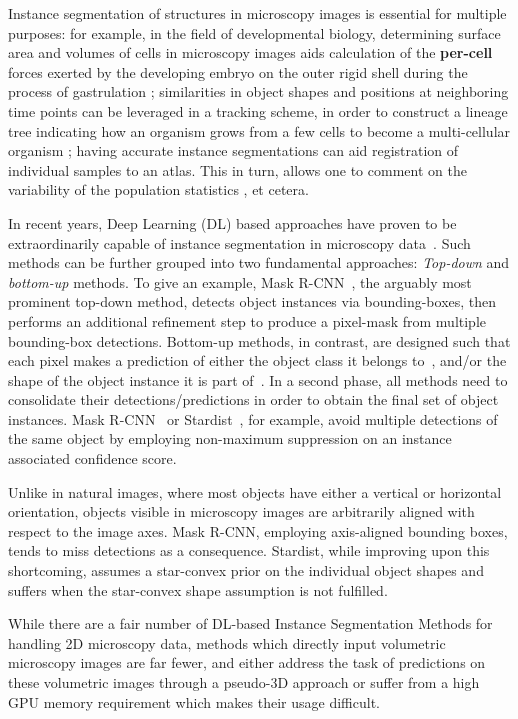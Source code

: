 \documentclass{midl} %
\begin{document}
Instance segmentation of structures in microscopy images is essential for multiple purposes: 
for example, in the field of developmental biology, determining surface area and volumes of cells in microscopy images aids calculation of the \textbf{per-cell} forces  exerted by the developing embryo on the outer rigid shell during the process of gastrulation \cite{munster2019}; 
similarities in  object shapes and positions at neighboring time points can be leveraged in a tracking scheme, in order to construct a lineage tree indicating how an organism grows from a few cells to become a multi-cellular organism \cite{tinevez2016};
having accurate instance segmentations can aid registration of individual samples to an atlas. This in turn, allows one to comment on the variability of the population statistics \cite{}, et cetera.

In recent years, Deep Learning (DL) based approaches have proven to be extraordinarily capable of instance segmentation in microscopy data~\cite{moen2019, caicedo2019_v2}.
Such methods can be further grouped into two fundamental approaches: \textit{Top-down} and \textit{bottom-up} methods. 
To give an example, Mask R-CNN~\cite{he2017}, the arguably most prominent top-down method, detects object instances via bounding-boxes, then performs an additional refinement step to produce a pixel-mask from multiple bounding-box detections.
Bottom-up methods, in contrast, are designed such that each pixel makes a prediction of either the object class it belongs to~\cite{ronneberger2015}, and/or the shape of the object instance it is part of~\cite{schmidt2018,neven2019,hirsch2020}. In a second phase, all methods need to consolidate their detections/predictions in order to obtain the final set of object instances.
Mask R-CNN~\cite{he2017} or Stardist~\cite{schmidt2018}, for example, avoid multiple detections of the same object by employing non-maximum suppression on an instance associated confidence score.

Unlike in natural images, where most objects have either a vertical or horizontal orientation, objects visible in microscopy images are arbitrarily aligned with respect to the image axes. Mask R-CNN, employing axis-aligned bounding boxes, tends to miss detections as a consequence. Stardist, while improving upon this shortcoming, assumes a star-convex prior on the individual object shapes and suffers when the star-convex shape assumption is not fulfilled. 

While there are a fair number of DL-based Instance Segmentation Methods for handling 2D microscopy data, methods which directly input volumetric microscopy images are far fewer, and either address the task of  predictions on these volumetric images through a pseudo-3D approach \cite{stringer2020} or suffer from a high GPU memory requirement which makes their usage difficult.
\end{document}
